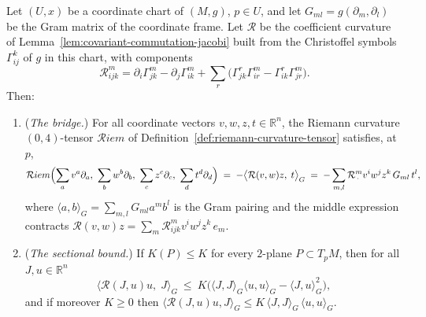 \begin{lemma}
\label{lem:chart-curvature-coordinates}
\leanok
Let $(U,x)$ be a coordinate chart of $(M,g)$, $p\in U$, and let
$G_{ml}=g(\partial_m,\partial_l)$ be the Gram matrix of the
coordinate frame. Let ${\mathcal R}$ be the coefficient curvature of
Lemma~\ref{lem:covariant-commutation-jacobi} built from the
Christoffel symbols $\Gamma^k_{ij}$ of $g$ in this chart, with
components
$${\mathcal R}^m_{ijk}
=\partial_i\Gamma^m_{jk}-\partial_j\Gamma^m_{ik}
+\sum_r\bigl(\Gamma^r_{jk}\Gamma^m_{ir}
-\Gamma^r_{ik}\Gamma^m_{jr}\bigr).$$
Then:
\begin{enumerate}
\item ({\em The bridge.}) For all coordinate vectors
$v,w,z,t\in\mathbb{R}^n$, the Riemann curvature $(0,4)$-tensor
${\mathcal R}iem$ of Definition~\ref{def:riemann-curvature-tensor}
satisfies, at $p$,
$${\mathcal R}iem\Bigl(\sum_a v^a\partial_a,\ \sum_b w^b\partial_b,\
\sum_c z^c\partial_c,\ \sum_d t^d\partial_d\Bigr)
\;=\;-\bigl\langle{\mathcal R}(v,w)z,\;t\bigr\rangle_G
\;=\;-\sum_{m,l}{\mathcal R}^m_{\,\cdot}v^iw^jz^k\,G_{ml}\,t^l,$$
where $\langle a,b\rangle_G=\sum_{m,l}G_{ml}a^mb^l$ is the Gram
pairing and the middle expression contracts
${\mathcal R}(v,w)z=\sum_m{\mathcal R}^m_{ijk}v^iw^jz^k\,e_m$.
\item ({\em The sectional bound.}) If $K(P)\le K$ for every
$2$-plane $P\subset T_pM$, then for all $J,u\in\mathbb{R}^n$
$$\bigl\langle{\mathcal R}(J,u)u,\;J\bigr\rangle_G\ \le\
K\bigl(\langle J,J\rangle_G\langle u,u\rangle_G
-\langle J,u\rangle_G^2\bigr),$$
and if moreover $K\ge0$ then
$\langle{\mathcal R}(J,u)u,J\rangle_G\le
K\,\langle J,J\rangle_G\,\langle u,u\rangle_G$.
\end{enumerate}
\end{lemma}

